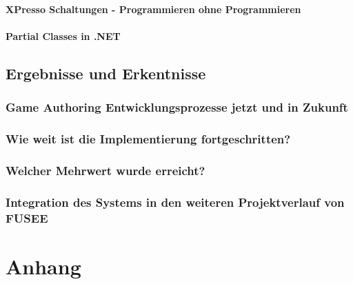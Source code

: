\documentclass[pagesize, paper=a4, fontsize=12pt,titlepage=true, headings=small, headnosepline, abstractoff, liststotoc, nochapterprefix, plainheadsepline, twoside]{scrreprt}
\begin{document}
\subsection{XPresso Schaltungen - Programmieren ohne Programmieren}
\subsection{Partial Classes in .NET}



\chapter{Ergebnisse und Erkentnisse}
\section{Game Authoring Entwicklungsprozesse jetzt und in Zukunft}
\section{Wie weit ist die Implementierung fortgeschritten?}
\section{Welcher Mehrwert wurde erreicht?}
\section{Integration des Systems in den weiteren Projektverlauf von FUSEE}


\part*{Anhang}


\lstlistoflistings

\listoftables
\end{document}
